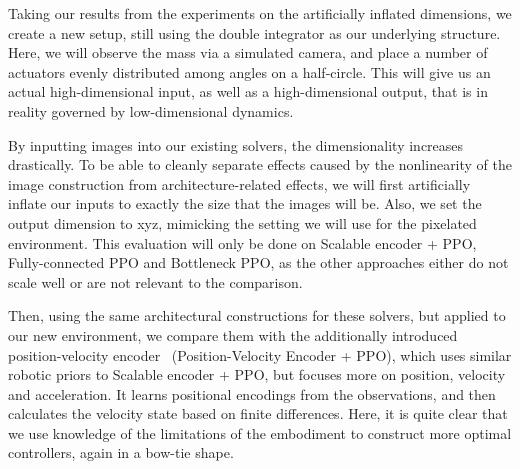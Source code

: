 Taking our results from the experiments on the artificially inflated dimensions, we create a new setup, still using the double
integrator as our underlying structure. Here, we will observe the mass via a simulated camera, and place a number of actuators
evenly distributed among angles on a half-circle. This will give us an actual high-dimensional input, as well as a high-dimensional
output, that is in reality governed by low-dimensional dynamics.

By inputting images into our existing solvers, the dimensionality increases drastically. To be able to cleanly separate effects caused
by the nonlinearity of the image construction from architecture-related effects, we will first artificially inflate our inputs to exactly the size that
the images will be. Also, we set the output dimension to xyz, mimicking the setting we will use for the pixelated
environment. This evaluation will only be done on Scalable encoder + PPO, Fully-connected PPO and Bottleneck PPO, as the other
approaches either do not scale well or are not relevant to the comparison.

Then, using the same architectural constructions for these solvers, but applied to our new environment,
we compare them with the additionally introduced position-velocity encoder~\cite{Jonschkowski2017PVE} (Position-Velocity Encoder + PPO),
which uses similar robotic priors to Scalable encoder + PPO, but focuses
more on position, velocity and acceleration. It learns positional encodings from the observations, and then calculates the velocity state based
on finite differences. Here, it is quite clear that we use knowledge of the limitations of the embodiment to construct more optimal controllers,
again in a bow-tie shape.

